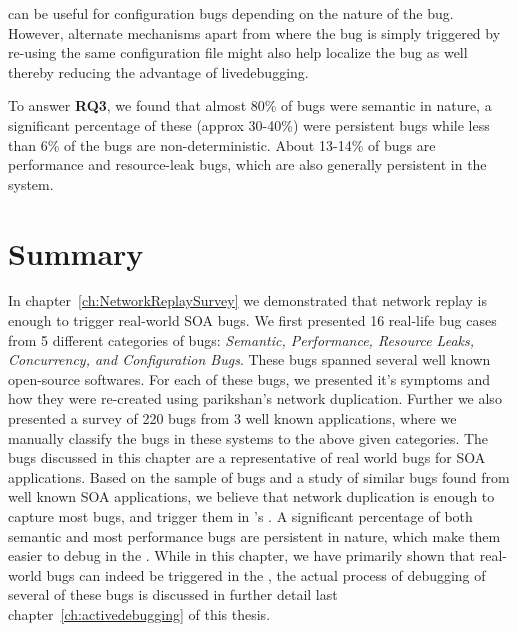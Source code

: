 \parikshan can be useful for configuration bugs depending on the nature of the bug. However, alternate mechanisms apart from \parikshan where the bug is simply triggered by re-using the same configuration file might also help localize the bug as well thereby reducing the advantage of livedebugging.





\begin{tcolorbox}
	To answer \textbf{RQ3}, we found that almost 80\% of bugs were semantic in nature, a significant percentage of these (approx 30-40\%) were persistent bugs while less than 6\% of the bugs are non-deterministic.
	About 13-14\% of bugs are performance and resource-leak bugs, which are also generally persistent in the system.
\end{tcolorbox}

\section{Summary}
\label{sec:parikshanCaseStudySummary}

In chapter~\ref{ch:NetworkReplaySurvey} we demonstrated that network replay is enough to trigger real-world SOA bugs.
We first presented 16 real-life bug cases from 5 different categories of bugs: \emph{Semantic, Performance, Resource Leaks, Concurrency, and Configuration Bugs}.
These bugs spanned several well known open-source softwares. For each of these bugs, we presented it's symptoms and how they were re-created using parikshan's network duplication.
Further we also presented a survey of 220 bugs from 3 well known applications, where we manually classify the bugs in these systems to the above given categories.
The bugs discussed in this chapter are a representative of real world bugs for SOA applications.
Based on the sample of bugs and a study of similar bugs found from well known SOA applications, we believe that network duplication is enough to capture most bugs, and trigger them in \parikshan's \debugcontainer.	
A significant percentage of both semantic and most performance bugs are persistent in nature, which make them easier to debug in the \debugcontainer. 
While in this chapter, we have primarily shown that real-world bugs can indeed be triggered in the \debugcontainer, the actual process of debugging  of several of these bugs is discussed in further detail last chapter~\ref{ch:activedebugging} of this thesis.